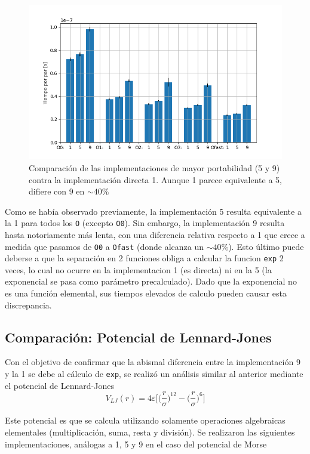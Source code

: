\documentclass[twoside, 12pt]{article}
\begin{document}
\begin{figure}[h]
	\centering
	\includegraphics[trim = 10mm 5mm 10mm 5mm, clip, scale=0.7]{Imagenes/Comp_tiempos_morse.png}
	\caption{Comparaci\'on de las implementaciones de mayor portabilidad (5 y 9) contra la implementaci\'on directa 1. Aunque 1 parece equivalente a 5, difiere con 9 en $\sim 40\%$}
	\label{fig:CompEsp}
\end{figure}

Como se hab\'ia observado previamente, la implementaci\'on 5 resulta equivalente a la 1 para todos los \texttt{O} (excepto \texttt{O0}). Sin embargo, la implementaci\'on 9 resulta hasta notoriamente m\'as lenta, con una diferencia relativa respecto a 1 que crece a medida que pasamos de \texttt{O0} a \texttt{Ofast} (donde alcanza un $\sim40\%$). Esto \'ultimo puede deberse a que la separaci\'on en 2 funciones obliga a calcular la funcion \texttt{exp} 2  veces, lo cual no ocurre en la implementacion 1 (es directa) ni en la 5 (la exponencial se pasa como par\'ametro precalculado). Dado que la exponencial no es una funci\'on elemental, sus tiempos elevados de calculo pueden causar esta discrepancia.

\subsection{Comparación: Potencial de Lennard-Jones}

Con el objetivo de confirmar que la abismal diferencia entre la implementaci\'on 9 y la 1 se debe al c\'alculo de \texttt{exp}, se realiz\'o un an\'alisis similar al anterior mediante el potencial de Lennard-Jones \[ V_{LJ} (r) =  4\varepsilon \Big[ \Big(\frac{r}{\sigma}\Big)^{12} -\Big(\frac{r}{\sigma}\Big)^{6} \Big] \]

Este potencial es que se calcula utilizando solamente operaciones algebraicas elementales (multiplicaci\'on, suma, resta y divisi\'on). Se realizaron las siguientes implementaciones, an\'alogas a 1, 5 y 9 en el caso del potencial de Morse
	
\end{document}
